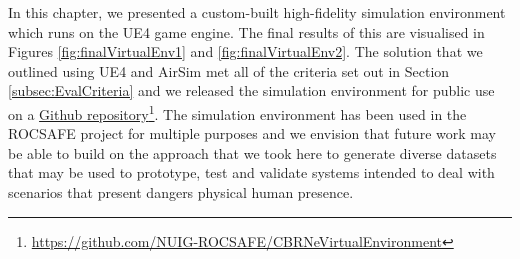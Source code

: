 In this chapter, we presented a custom-built high-fidelity simulation environment which runs on the UE4 game engine. The final results of this are visualised in Figures \ref{fig:finalVirtualEnv1} and \ref{fig:finalVirtualEnv2}. The solution that we outlined using UE4 and AirSim met all of the criteria set out in Section \ref{subsec:EvalCriteria} and we released the simulation environment for public use on a \href{https://github.com/NUIG-ROCSAFE/CBRNeVirtualEnvironment}{Github repository}\footnote{\href{https://github.com/NUIG-ROCSAFE/CBRNeVirtualEnvironment}{https://github.com/NUIG-ROCSAFE/CBRNeVirtualEnvironment}}.
The simulation environment has been used in the ROCSAFE project for multiple purposes and we envision that future work may be able to build on the approach that we took here to generate diverse datasets that may be used to prototype, test and validate systems intended to deal with scenarios that present dangers physical human presence.\par